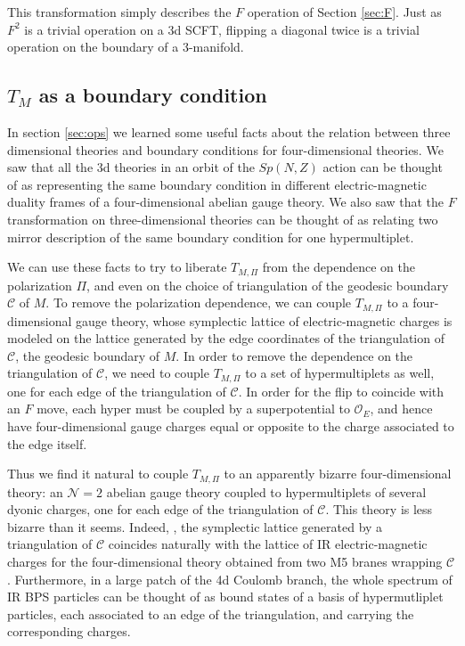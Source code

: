 \documentclass[hyper,letterpaper]{JHEP3}
\numberwithin{equation}{section}
\newcommand{\CC}{\mathcal{C}}
\newcommand{\CN}{\mathcal{N}}
\newcommand{\CO}{\mathcal{O}}
\begin{document}
This transformation simply describes the $F$ operation of Section \ref{sec:F}. Just as $F^2$ is a trivial operation on a 3d SCFT, flipping a diagonal twice is a trivial operation on the boundary of a 3-manifold.





\subsection{$T_M$ as a boundary condition}
\label{sec:gauge4d}


In section \ref{sec:ops} we learned some useful facts about the relation between
three dimensional theories and boundary conditions for four-dimensional theories.
We saw that all the 3d theories in an orbit of the $Sp(N,Z)$ action can be
thought of as representing the same boundary condition in different electric-magnetic duality frames
of a four-dimensional abelian gauge theory.
We also saw that the $F$ transformation on three-dimensional theories
can be thought of as relating two mirror description of the
same boundary condition for one hypermultiplet.

We can use these facts to try to liberate $T_{M,\Pi}$ from the dependence on the polarization $\Pi$,
and even on the choice of triangulation of the geodesic boundary $\CC$ of $M$. To remove the polarization dependence, we can
couple $T_{M,\Pi}$ to a four-dimensional gauge theory, whose symplectic  lattice of electric-magnetic charges
is modeled on the lattice generated by the edge coordinates of the triangulation of $\CC$, the geodesic boundary of $M$.
In order to remove the dependence on the triangulation of $\CC$, we need to couple $T_{M,\Pi}$ to a set of hypermultiplets as well,
one for each edge of the triangulation of $\CC$. In order for the flip to coincide with an $F$ move,
each hyper must be coupled by a superpotential to $\CO_E$, and hence have four-dimensional gauge charges equal or opposite to
the charge associated to the edge itself.

Thus we find it natural to couple $T_{M,\Pi}$ to an apparently bizarre four-dimensional theory:
an $\CN=2$ abelian gauge theory coupled to hypermultiplets of several dyonic charges, one for each edge of the triangulation of $\CC$.
This theory is less bizarre than it seems. Indeed, \cite{GMNIII}, the symplectic  lattice generated by a triangulation of $\CC$
coincides naturally with the lattice of IR electric-magnetic charges for the four-dimensional theory obtained from two M5 branes wrapping $\CC$.
Furthermore, in a large patch of the 4d Coulomb branch, the whole spectrum of IR BPS particles can be thought of
as bound states of a basis of hypermutliplet particles, each associated to an edge of the triangulation, and carrying the corresponding charges.
\end{document}
